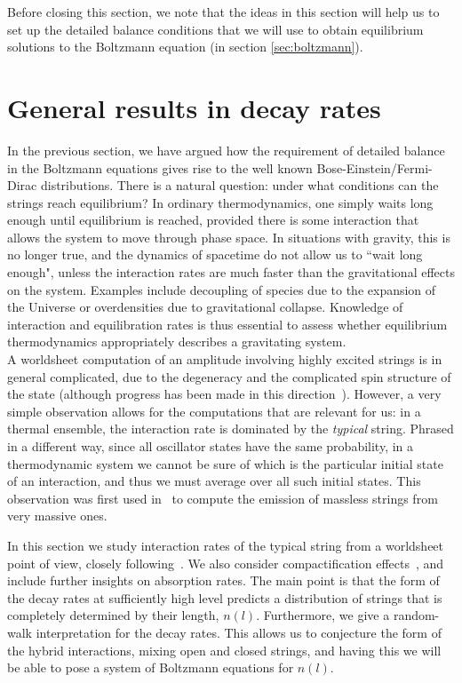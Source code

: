 \documentclass[a4paper,11pt]{article}
\begin{document}
  Before closing this section, we note that the ideas in this section will help us to
set up the detailed balance conditions that we will use to obtain equilibrium solutions
to the Boltzmann equation (in section \ref{sec:boltzmann}).

     

\section{General results in decay rates}\label{sec:decayrates}

In the previous section, we have argued how the requirement of detailed balance in the Boltzmann equations gives rise to the well known Bose-Einstein/Fermi-Dirac distributions. 
There is a natural question: under what conditions can the strings reach equilibrium? 
In ordinary thermodynamics, one simply waits long enough until equilibrium is reached, provided there is some interaction that allows the system to move through phase space.
In situations with gravity, this is no longer true, and the dynamics of spacetime do not allow us to ``wait long enough", unless the interaction rates are much faster than the gravitational effects on the system.
Examples include decoupling of species due to the expansion of the Universe or overdensities due to gravitational collapse.
Knowledge of interaction and equilibration rates is thus essential to assess whether equilibrium thermodynamics appropriately describes a gravitating system.
\\

A worldsheet computation of an amplitude involving highly excited strings is in general complicated, due to the degeneracy and the complicated spin structure of the state (although progress has been made in this direction~\cite{Hindmarsh:2010if, Skliros:2011si, Skliros:2013pka}).
However, a very simple observation allows for the computations that are relevant for us: in a thermal ensemble, the interaction rate is dominated by the \textit{typical} string.
Phrased in a different way, since all oscillator states have the same probability, in a thermodynamic system we cannot be sure of which is the particular initial state of an interaction, and thus we must average over all such initial states.
This observation was first used in~\cite{Amati:1999fv} to compute the emission of massless strings from very massive ones.

In this section we study interaction rates of the typical string from a worldsheet point of view, closely following~\cite{Manes:2001cs}.
We also consider compactification effects~\cite{Chen:2005ra}, and include further insights on absorption rates.
The main point is that the form of the decay rates at sufficiently high level predicts a distribution of strings that is completely determined by their length, $n(l)$.
Furthermore, we give a random-walk interpretation for the decay rates. 
This allows us to conjecture the form of the hybrid interactions, mixing open and closed strings, and having this we will be able to pose a system of Boltzmann equations for $n(l)$.
\end{document}
